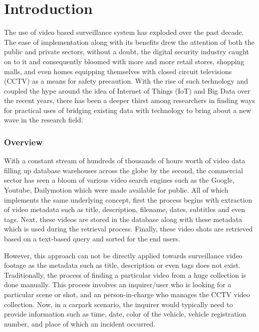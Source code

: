 \chapter{Introduction}
The use of video based surveillance system has exploded over the past decade. The ease of implementation along with its benefits drew the attention of both the public and private sectors, without a doubt, the digital security industry caught on to it and consequently bloomed with more and more retail stores, shopping malls, and even homes equipping themselves with closed circuit televisions (CCTV) as a means for safety precaution. With the rise of such technology and coupled the hype around the idea of Internet of Things (IoT) and Big Data over the recent years, there has been a deeper thirst among researchers in finding ways for practical uses of bridging existing data with technology to bring about a new wave in the research field.

\subsection{Overview}
\label{section:introduction}

With a constant stream of hundreds of thousands of hours worth of  video data filling up database warehouses across the globe by the second, the commercial sector has seen a bloom of various video search engines such as the Google, Youtube, Dailymotion which were made available for public. All of which implements the same underlying concept, first the process begins with extraction of video metadata such as title, description, filename, dates, subtitles and even tags. Next, these videos are stored in the database along with these metadata which is used during the retrieval process. Finally, these video shots are retrieved based on a text-based query and sorted for the end users. 

However, this approach can not be directly applied towards surveillance video footage as the metadata such as title, description or even tags does not exist. Traditionally, the process of finding a particular video from a huge collection is done manually. This process involves an inquirer/user who is looking for a particular scene or shot, and an person-in-charge who manages the CCTV video collection. Now, in a carpark scenario, the inquirer would typically need to provide information such as time, date, color of the vehicle, vehicle registration number, and place of which an incident occurred. 

